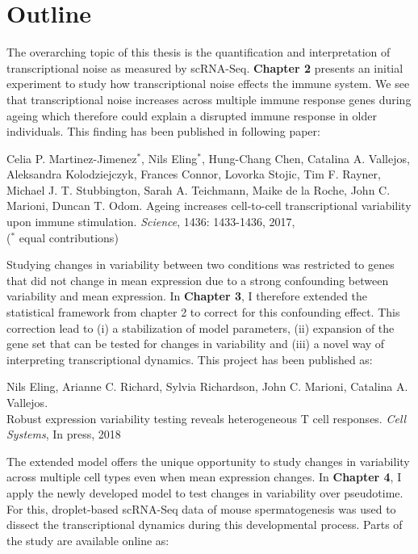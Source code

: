

\section{Outline}

The overarching topic of this thesis is the quantification and interpretation of transcriptional noise as measured by scRNA-Seq. \textbf{Chapter 2} presents an initial experiment to study how  transcriptional noise effects the immune system. We see that transcriptional noise increases across multiple immune response genes during ageing which therefore could explain a disrupted immune response in older individuals. This finding has been published in following paper:

\begin{Abstract}
\hspace{-5mm} Celia P. Martinez-Jimenez$^\ast$, Nils  Eling$^\ast$, Hung-Chang Chen, Catalina A. Vallejos, Aleksandra Kolodziejczyk, Frances Connor, Lovorka Stojic, Tim F. Rayner, Michael J. T. Stubbington, Sarah A. Teichmann, Maike de la Roche, John C. Marioni, Duncan T. Odom. Ageing increases cell-to-cell transcriptional variability upon immune stimulation. \emph{Science}, 1436: 1433-1436, 2017, \\
($^\ast$ equal contributions) 
\end{Abstract}

Studying changes in variability between two conditions was restricted to genes that did not change in mean expression due to a strong confounding between variability and mean expression. In \textbf{Chapter 3}, I therefore extended the statistical framework from chapter 2 to correct for this confounding effect. This correction lead to (i) a stabilization of model parameters, (ii) expansion of the gene set that can be tested for changes in variability and (iii) a novel way of interpreting transcriptional dynamics. This project has been published as:

\begin{Abstract}
\hspace{-5mm} Nils Eling, Arianne C. Richard, Sylvia Richardson, John C. Marioni, Catalina A. Vallejos. \\
Robust expression variability testing reveals heterogeneous T cell responses. \emph{Cell Systems}, In press, 2018
\end{Abstract}

The extended model offers the unique opportunity to study changes in variability across multiple cell types even when mean expression changes. In \textbf{Chapter 4}, I apply the newly developed model to test changes in variability over pseudotime. For this, droplet-based scRNA-Seq data of mouse spermatogenesis was used to dissect the transcriptional dynamics during this developmental process. Parts of the study are available online as:

